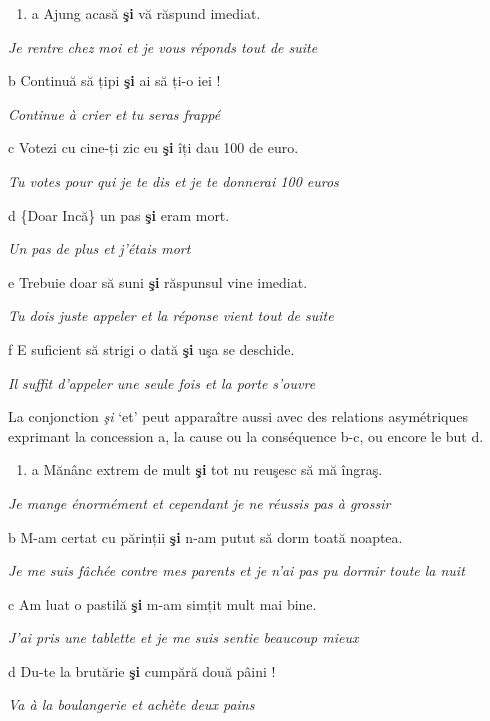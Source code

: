 \begin{enumerate}
\item \label{bkm:Ref300861185}a  Ajung acasă \textbf{şi} vă răspund imediat.


\end{enumerate}
{\itshape
Je rentre chez moi et je vous réponds tout de suite}

  b  Continuă să țipi \textbf{şi} ai să ți-o iei !

{\itshape
Continue à crier et tu seras frappé}

  c  Votezi cu cine-ți zic eu \textbf{şi} îți dau 100 de euro.

{\itshape
Tu votes pour qui je te dis et je te donnerai 100 euros}

  d  \{Doar {\textbar} Incă\} un pas \textbf{şi} eram mort.

{\itshape
Un pas de plus et j'étais mort}

  e  Trebuie doar să suni \textbf{şi} răspunsul vine imediat. 

{\itshape
Tu dois juste appeler et la réponse vient tout de suite}

  f  E suficient să strigi o dată \textbf{şi} uşa se deschide.

    \textit{Il suffit d'appeler une seule fois et la porte s'ouvre}

La conjonction \textit{şi} `et' peut apparaître aussi avec des relations asymétriques exprimant la concession a, la cause ou la conséquence b-c, ou encore le but d.~


\begin{enumerate}
\item \label{bkm:Ref300864102}a  Mănânc extrem de mult \textbf{şi} tot nu reuşesc să mă îngraş.


\end{enumerate}
{\itshape
Je mange énormément et cependant je ne réussis pas à grossir}

  b  M-am certat cu părinții \textbf{şi} n-am putut să dorm toată noaptea.

{\itshape
Je me suis fâchée contre mes parents et je n'ai pas pu dormir toute la nuit}

  c  Am luat o pastilă \textbf{şi} m-am simțit mult mai bine.

    \textit{J'ai pris une tablette et je me suis sentie beaucoup mieux}

  d  Du-te la brutărie \textbf{şi} cumpără două pâini !

    \textit{Va à la boulangerie et achète deux pains}

